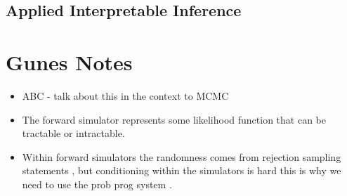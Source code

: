 \documentclass[]{scrartcl}
\begin{document}
\subsection{Applied Interpretable Inference}


\section{Gunes Notes}
\begin{itemize}
	\item ABC - talk about this in the context to MCMC
	\item The forward simulator represents some likelihood function that can be tractable or intractable. 
	\item Within forward simulators the randomness comes from rejection sampling statements , but conditioning within the simulators is hard
this is why we need to use the prob prog system . 
\end{itemize}
\end{document}
